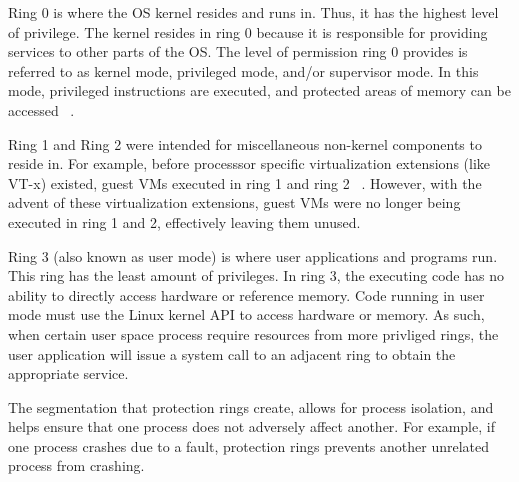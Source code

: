 \documentclass{report}
\begin{document}
\begin{spacing}{1.5}
{\large
\noindent Ring 0 is where the OS kernel resides and runs in. Thus, it has the highest level of privilege. The kernel resides in ring 0 because it is responsible for providing services to other parts of the OS. The level of permission ring 0 provides is referred to as kernel mode, privileged mode, and/or supervisor mode. In this mode, privileged instructions are executed, and protected areas of memory can be accessed ~\cite{Wiley2011}.
\leavevmode\newline
}

{\large
\noindent Ring 1 and Ring 2 were intended for miscellaneous non-kernel components to reside in. For example, before processsor specific virtualization extensions (like VT-x) existed, guest VMs executed in ring 1 and ring 2 ~\cite{chirammal2016mastering}. However, with the advent of these virtualization extensions, guest VMs were no longer being executed in ring 1 and 2, effectively leaving them unused.
\leavevmode\newline
}

{\large
\noindent Ring 3 (also known as user mode) is where user applications and programs run. This ring has the least amount of privileges. In ring 3, the executing code has no ability to directly access hardware or reference memory. Code running in user mode must use the Linux kernel API to access hardware or memory. As such, when certain user space process require resources from more privliged rings, the user application will issue a system call to an adjacent ring to obtain the appropriate service.
\newline
}

{\large
\noindent The segmentation that protection rings create, allows for process isolation, and helps ensure that one process does not adversely affect another. For example, if one process crashes due to a fault, protection rings prevents another unrelated process from crashing.
}
\newpage
















{\large
{}
\begin{figure}[ht]
\begin{center}
\begin{tikzpicture}


\end{tikzpicture}
\end{center}
\end{figure}}
\end{spacing}
\end{document}
